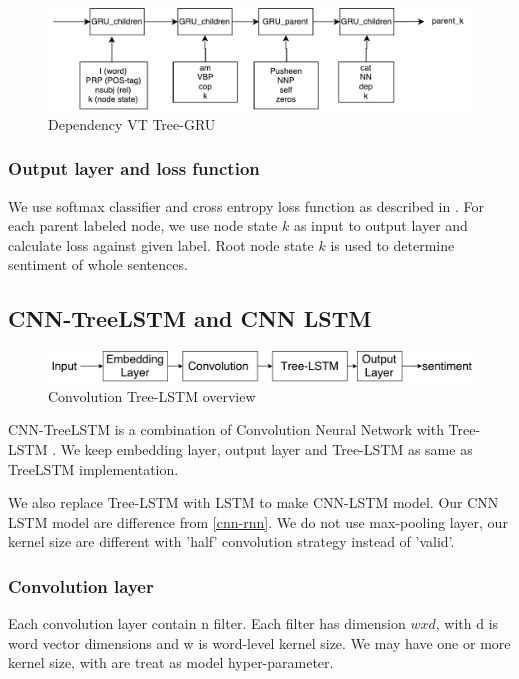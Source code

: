 \begin{figure}[H]
	\centering
	\includegraphics[width=0.9\linewidth]{figure/dependencyvtgru}
	\caption[Dependency VT Tree-GRU]{Dependency VT Tree-GRU}
	\label{fig:dependencyvtgru}
\end{figure}

\subsubsection{Output layer and loss function}
We use softmax classifier and cross entropy loss function as described in \cite{treeLSTM}.  For each parent labeled node, we use node state $k$ as input to output layer and calculate loss against given label. Root node state $k$ is used to determine sentiment of whole sentences.


\subsection{CNN-TreeLSTM and CNN LSTM}\label{sec:CNNtree}

\begin{figure}[H]
	\centering
	\includegraphics[width=0.8\linewidth]{figure/convtreelstmsummary}
	\caption[Convolution Tree-LSTM overview]{Convolution Tree-LSTM overview}
	\label{fig:convtreelstmsummary}
\end{figure}

CNN-TreeLSTM is a combination of Convolution Neural Network with Tree-LSTM \cite{treeLSTM}. We keep embedding layer, output layer and Tree-LSTM as same as TreeLSTM implementation.

 We also replace Tree-LSTM with LSTM to make CNN-LSTM model. Our CNN LSTM model are difference from \ref{cnn-rnn}. We do not use max-pooling layer, our kernel size are different with 'half' convolution strategy instead of 'valid'. 

\subsubsection{Convolution layer} \label{sec:conv1c}
Each convolution layer contain n filter. Each filter has dimension $w x d$, with d is word vector dimensions and w is word-level kernel size. We may have one or more kernel size, with are treat as model hyper-parameter. 

